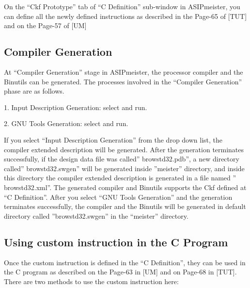 On the ``Ckf Prototype'' tab of ``C Definition'' sub-window in
ASIPmeister, you can define all the newly defined instructions as
described in the Page-65 of {[}TUT{]} and on the Page-57 of {[}UM{]}

\hypertarget{compiler-generation}{%
\subsection{Compiler Generation}\label{compiler-generation}}

At ``Compiler Generation'' stage in ASIPmeister, the processor compiler
and the Binutils can be generated. The processes involved in the
``Compiler Generation'' phase are as follows.

1. Input Description Generation: select and run.

2. GNU Tools Generation: select and run.

If you select ``Input Description Generation'' from the drop down list,
the compiler extended description will be generated. After the
generation terminates successfully, if the design data file was called''
browstd32.pdb'', a new directory called'' browstd32.swgen'' will be
generated inside ''meister'' directory, and inside this directory the
compiler extended description is generated in a file named ''
browstd32.xml''. The generated compiler and Binutils supports the Ckf
defined at ``C Definition''. After you select ``GNU Tools Generation''
and the generation terminates successfully, the compiler and the
Binutils will be generated in default directory called
''browstd32.swgen'' in the ``meister'' directory.

\hypertarget{using-custom-instruction-in-the-c-program}{%
\subsection{Using custom instruction in the C
Program}\label{using-custom-instruction-in-the-c-program}}

Once the custom instruction is defined in the ``C Definition'', they can
be used in the C program as described on the Page-63 in {[}UM{]} and on
Page-68 in {[}TUT{]}. There are two methods to use the custom
instruction here:

